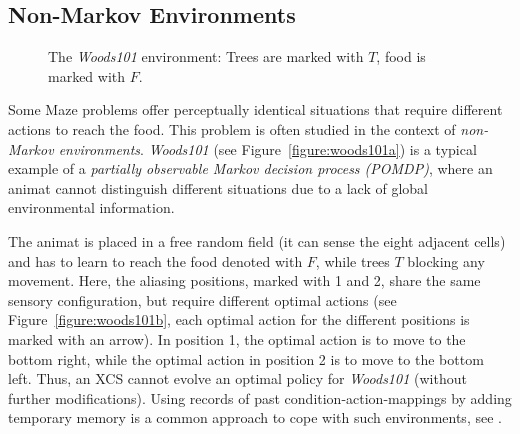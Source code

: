 \documentclass{sig-alternate}
\begin{document}
\subsection{Non-Markov Environments}
\label{subsection:non-markov-environments}

\begin{figure}[ht]
  \hfill
  \hfill
  \caption{The \emph{Woods101} environment: Trees are marked with $T$, food is marked with $F$.}
  \label{figure:woods101}
\end{figure}

Some Maze problems offer perceptually identical situations that require different actions to reach the food. This problem is often studied in the context of \emph{non-Markov environments}. \emph{Woods101} (see Figure~\ref{figure:woods101a}) is a typical example of a \emph{partially observable Markov decision process (POMDP)}, where an animat cannot distinguish different situations due to a lack of global environmental information. 

The animat is placed in a free random field (it can sense the eight adjacent cells) and has to learn to reach the food denoted with $F$, while trees $T$ blocking any movement. Here, the aliasing positions, marked with 1 and 2, share the same sensory configuration, but require different optimal actions (see Figure~\ref{figure:woods101b}, each optimal action for the different positions is marked with an arrow). In position 1, the optimal action is to move to the bottom right, while the optimal action in position 2 is to move to the bottom left. Thus, an XCS cannot evolve an optimal policy for \emph{Woods101} (without further modifications). Using records of past condition-action-mappings by adding temporary memory is a common approach to cope with such environments, see \cite{Lan98,LW00}.
\end{document}
